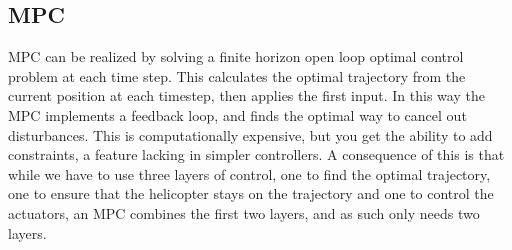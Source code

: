 
\subsection{MPC}
MPC can be realized by solving a finite horizon open loop optimal control problem at each time step. This calculates the optimal trajectory from the current position at each timestep, then applies the first input. In this way the MPC implements a feedback loop, and finds the optimal way to cancel out disturbances. This is computationally expensive, but you get the ability to add constraints, a feature lacking in simpler controllers. A consequence of this is that while we have to use three layers of control, one to find the optimal trajectory, one to ensure that the helicopter stays on the trajectory and one to control the actuators, an MPC combines the first two layers, and as such only needs two layers.

%
%
